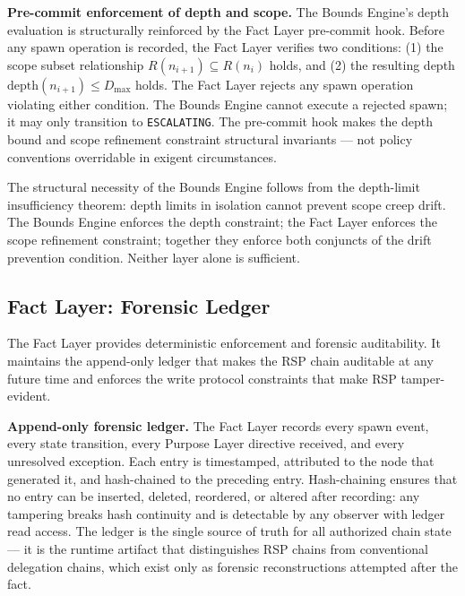 \medskip
\noindent\textbf{Pre-commit enforcement of depth and scope.} The Bounds Engine's depth evaluation is structurally reinforced by the Fact Layer pre-commit hook. Before any spawn operation is recorded, the Fact Layer verifies two conditions: (1) the scope subset relationship $R(n_{i+1}) \subseteq R(n_i)$ holds, and (2) the resulting depth $\mathrm{depth}(n_{i+1}) \leq D_{\mathrm{max}}$ holds. The Fact Layer rejects any spawn operation violating either condition. The Bounds Engine cannot execute a rejected spawn; it may only transition to \texttt{ESCALATING}. The pre-commit hook makes the depth bound and scope refinement constraint structural invariants --- not policy conventions overridable in exigent circumstances.

The structural necessity of the Bounds Engine follows from the depth-limit insufficiency theorem: depth limits in isolation cannot prevent scope creep drift. The Bounds Engine enforces the depth constraint; the Fact Layer enforces the scope refinement constraint; together they enforce both conjuncts of the drift prevention condition. Neither layer alone is sufficient.

\subsection{Fact Layer: Forensic Ledger}
\label{sec:rs-fact-ledger}

The Fact Layer provides deterministic enforcement and forensic auditability. It maintains the append-only ledger that makes the RSP chain auditable at any future time and enforces the write protocol constraints that make RSP tamper-evident.

\medskip
\noindent\textbf{Append-only forensic ledger.} The Fact Layer records every spawn event, every state transition, every Purpose Layer directive received, and every unresolved exception. Each entry is timestamped, attributed to the node that generated it, and hash-chained to the preceding entry. Hash-chaining ensures that no entry can be inserted, deleted, reordered, or altered after recording: any tampering breaks hash continuity and is detectable by any observer with ledger read access. The ledger is the single source of truth for all authorized chain state --- it is the runtime artifact that distinguishes RSP chains from conventional delegation chains, which exist only as forensic reconstructions attempted after the fact.


